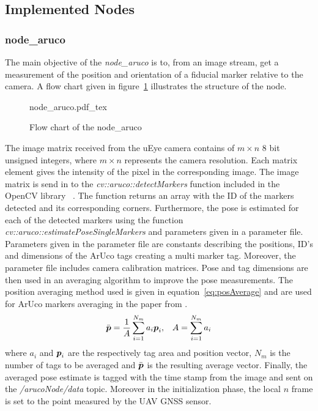 \subsection{Implemented Nodes} %
\label{sub:implemented_nodes}

\subsubsection{node\_aruco} %
\label{ssub:node_aruco}
The main objective of the \textit{node\_aruco} is to, from an image stream, get a measurement of the position and orientation of a fiducial marker relative to the camera. A flow chart given in figure~\ref{fig:nodeAruco} illustrates the structure of the node. 
\begin{figure}[ht]
    \centering
    {node_aruco.pdf_tex}
    \caption{Flow chart of the node\_aruco}
    \label{fig:nodeAruco}
\end{figure}
The image matrix received from the uEye camera contains of $m\times n$ 8 bit unsigned integers, where $m\times n$ represents the camera resolution. Each matrix element gives the intensity of the pixel in the corresponding image. The image matrix is send in to the \textit{cv::aruco::detectMarkers} function included in the OpenCV library ~\citep{itseez2018opencv}. The function returns an array with the ID of the markers detected and its corresponding corners. Furthermore, the pose is estimated for each of the detected markers using the function \textit{cv::aruco::estimatePoseSingleMarkers} and parameters given in a parameter file. Parameters given in the parameter file are constants describing the positions, ID's and dimensions of the ArUco tags creating a multi marker tag. Moreover, the parameter file includes camera calibration matrices. Pose and tag dimensions are then used in an averaging algorithm to improve the pose measurements. The position averaging method used is given in equation~\ref{eq:posAverage} and are used for ArUco markers averaging in the paper from \cite{tordal2017relative}.
\begin{align}\label{eq:posAverage}
	& \bar{\boldsymbol{p}}=\frac{1}{A}\sum_{i=1}^{N_m}{a_i \boldsymbol{p}_i}, & A=\sum_{i=1}^{N_m}{a_i}
\end{align}
where $a_i$ and $\boldsymbol{p}_i$ are the respectively tag area and position vector, $N_m$ is the number of tags to be averaged and $\bar{\boldsymbol{p}}$ is the resulting average vector. Finally, the averaged pose estimate is tagged with the time stamp from the image and sent on the \textit{/arucoNode/data} topic. Moreover in the initialization phase, the local $n$ frame is set to the point measured by the \gls{UAV} \gls{GNSS} sensor. 

